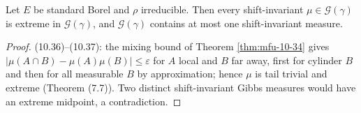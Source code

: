 \begin{theorem}[Georgii (10.35)]
    \label{thm:mfu-10-35}
    \leanok

    Let $E$ be standard Borel and $\rho$ irreducible. Then every shift-invariant
    $\mu \in \mathcal G(\gamma)$ is extreme in $\mathcal G(\gamma)$, and $\mathcal G(\gamma)$
    contains at most one shift-invariant measure.
\end{theorem}
\begin{proof}
    \leanok
    (10.36)–(10.37): the mixing bound of Theorem \ref{thm:mfu-10-34} gives
    $|\mu(A \cap B) - \mu(A)\mu(B)| \leq \varepsilon$ for $A$ local and $B$ far away, first for
    cylinder $B$ and then for all measurable $B$ by approximation; hence $\mu$ is tail trivial and
    extreme (Theorem (7.7)). Two distinct shift-invariant Gibbs measures would have an extreme
    midpoint, a contradiction.
\end{proof}
